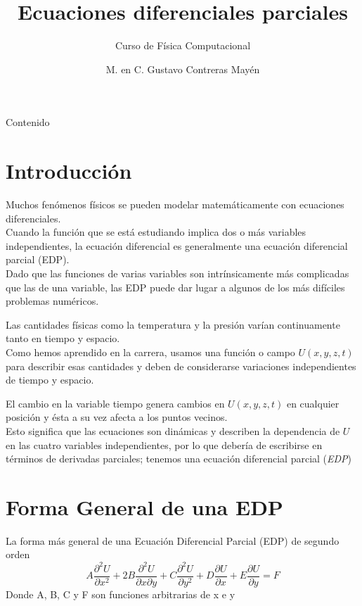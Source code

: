 

\title{Ecuaciones diferenciales parciales}
\subtitle{Curso de Física Computacional}
\author{M. en C. Gustavo Contreras Mayén}

\maketitle
\fontsize{14}{14}\selectfont
{}
\begin{frame}{Contenido}
\tableofcontents[pausesections]
\end{frame}
\section{Introducción}
\begin{frame}
Muchos fenómenos físicos se pueden modelar matemáticamente con ecuaciones diferenciales.
\\
\medskip
Cuando la función que se está estudiando implica dos o más variables independientes, la ecuación diferencial es generalmente una ecuación diferencial parcial (EDP).
\\
\medskip
Dado que las funciones de varias variables son intrínsicamente más complicadas que las de una variable, las EDP puede dar lugar  a algunos de los más difíciles problemas numéricos.
\end{frame}
\begin{frame}
Las cantidades físicas como la temperatura y la presión varían continuamente tanto en tiempo y espacio.
\\
\medskip
Como hemos aprendido en la carrera, usamos una función o campo  $U(x, y, z, t)$ para describir esas cantidades y deben de considerarse variaciones independientes de tiempo y espacio.
\end{frame}
\begin{frame}
El cambio en la variable tiempo genera cambios en  $U (x, y, z, t)$ en cualquier posición y ésta a su vez afecta a los puntos vecinos.
\\
\medskip
Esto significa que las ecuaciones son dinámicas y describen la dependencia de $U$ en las cuatro variables independientes, por lo que debería de escribirse en términos de derivadas parciales; tenemos una ecuación diferencial parcial (\textit{EDP})
\end{frame}
\section{Forma General de una EDP}
\begin{frame}
La forma más general de una Ecuación Diferencial Parcial (EDP) de segundo orden
\[ A \dfrac{\partial^{2} U}{\partial x^{2}} + 2B \dfrac{\partial^{2} U}{\partial x \partial y} + C \dfrac{\partial^{2} U}{\partial y^{2}} + D \dfrac{\partial U}{\partial x} + E \dfrac{\partial U}{\partial y} = F \]
Donde A, B, C y F son funciones arbitrarias
de x e y
\end{frame}
